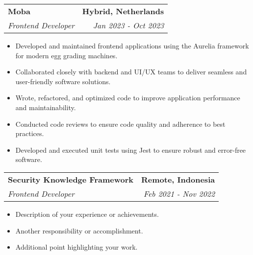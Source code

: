 
\begin{tabularx}{\textwidth}{Xr}
    \textbf{Moba} & \textbf{Hybrid, Netherlands} \\
    \textit{Frontend Developer} & \textit{Jan 2023 - Oct 2023} \\
\end{tabularx}

\vspace{.5em} %

\begin{itemize}[left=0em, noitemsep, nolistsep]
    \item Developed and maintained frontend applications using the Aurelia framework for modern egg grading machines.
    \item Collaborated closely with backend and UI/UX teams to deliver seamless and user-friendly software solutions.
    \item Wrote, refactored, and optimized code to improve application performance and maintainability.
    \item Conducted code reviews to ensure code quality and adherence to best practices.
    \item Developed and executed unit tests using Jest to ensure robust and error-free software.
\end{itemize}

\vspace{1em} %

\noindent
\begin{tabularx}{\textwidth}{Xr}
    \textbf{Security Knowledge Framework} & \textbf{Remote, Indonesia} \\
    \textit{Frontend Developer} & \textit{Feb 2021 - Nov 2022} \\
\end{tabularx}

\vspace{.5em} %

\noindent
\begin{itemize}[left=0em, noitemsep, nolistsep]
    \item Description of your experience or achievements.
    \item Another responsibility or accomplishment.
    \item Additional point highlighting your work.
\end{itemize}

\vspace{1em}

